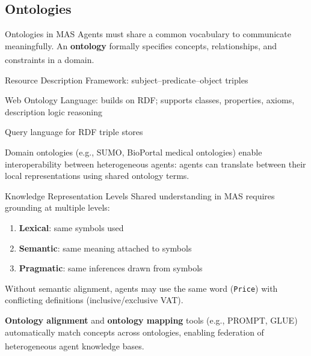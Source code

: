 \subsection{Ontologies}

\begin{v3topic}{Ontologies in MAS}
    Agents must share a common vocabulary to communicate meaningfully.
    An \textbf{ontology} formally specifies concepts, relationships, and
    constraints in a domain.\textsuperscript{\cite[][p.~198]{wooldridgeIntroductionMultiAgentSystems2009}}

    \begin{description}[leftmargin=0.6cm, labelindent=0pt]
        \item[\textbf{RDF}] Resource Description Framework: subject--predicate--object triples
        \item[\textbf{OWL}] Web Ontology Language: builds on RDF; supports classes, properties,
              axioms, description logic reasoning
        \item[\textbf{SPARQL}] Query language for RDF triple stores
    \end{description}
    Domain ontologies (e.g., SUMO, BioPortal medical ontologies) enable
    interoperability between heterogeneous agents: agents can translate
    between their local representations using shared ontology terms.

\end{v3topic}
\begin{v3topic}{Knowledge Representation Levels}
    Shared understanding in MAS requires grounding at multiple levels:
    \begin{enumerate}
        \item \textbf{Lexical}: same symbols used
        \item \textbf{Semantic}: same meaning attached to symbols
        \item \textbf{Pragmatic}: same inferences drawn from symbols
    \end{enumerate}
    Without semantic alignment, agents may use the same word (\texttt{Price})
    with conflicting definitions (inclusive/exclusive VAT).

    \textbf{Ontology alignment} and \textbf{ontology mapping} tools (e.g., PROMPT,
    GLUE) automatically match concepts across ontologies, enabling federation
    of heterogeneous agent knowledge
    bases.\textsuperscript{\cite[][p.~201]{weissMultiagentSystems2013}}

\end{v3topic}

